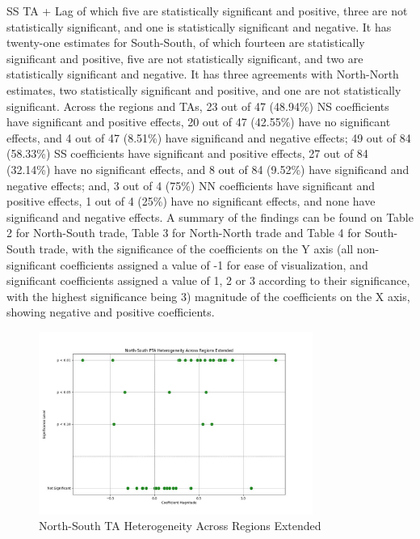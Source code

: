 SS TA + Lag of which five are statistically significant and positive,
three are not statistically significant, and one is statistically
significant and negative. It has twenty-one estimates for South-South,
of which fourteen are statistically significant and positive, five are
not statistically significant, and two are statistically significant and
negative. It has three agreements with North-North estimates, two
statistically significant and positive, and one are not statistically
significant. Across the regions and TAs, 23 out of 47 (48.94\%) NS
coefficients have significant and positive effects, 20 out of 47
(42.55\%) have no significant effects, and 4 out of 47 (8.51\%) have
significand and negative effects; 49 out of 84 (58.33\%) SS coefficients
have significant and positive effects, 27 out of 84 (32.14\%) have no
significant effects, and 8 out of 84 (9.52\%) have significand and
negative effects; and, 3 out of 4 (75\%) NN coefficients have
significant and positive effects, 1 out of 4 (25\%) have no significant
effects, and none have significand and negative effects. A summary of
the findings can be found on Table 2 for North-South trade, Table 3 for
North-North trade and Table 4 for South-South trade, with the
significance of the coefficients on the Y axis (all non-significant
coefficients assigned a value of -1 for ease of visualization, and
significant coefficients assigned a value of 1, 2 or 3 according to
their significance, with the highest significance being 3) magnitude of
the coefficients on the X axis, showing negative and positive
coefficients.
%


\begin{figure}[h!]%
\centering%
\includegraphics[width=0.8\textwidth]{figures/North-South_trade_relationships_visualization.jpeg}%
\caption{North{-}South TA Heterogeneity Across Regions Extended}%
\end{figure}

